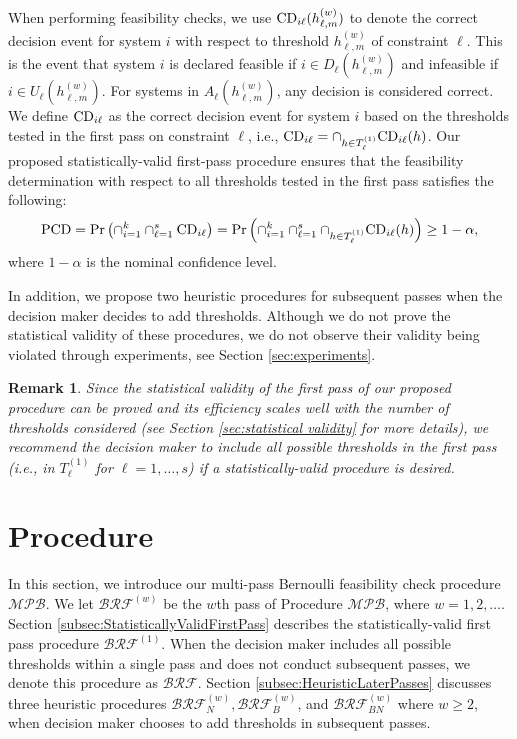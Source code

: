 \documentclass[11pt]{article}
\newtheorem{remark}{Remark}
\begin{document}
When performing feasibility checks, we use ${\rm CD}_{i\ell}(h_{\ell,m}^{(w)})$ to denote the correct decision event for system $i$ with respect to threshold $h_{\ell,m}^{(w)}$ of constraint $\ell$. This is the event that system $i$ is declared feasible if $i \in D_\ell(h_{\ell,m}^{(w)})$ and infeasible if $i \in U_\ell(h_{\ell,m}^{(w)})$. For systems in $A_\ell(h_{\ell,m}^{(w)})$, any decision is considered correct. We define ${\rm CD}_{i\ell}$ as the correct decision event for system $i$ based on the thresholds tested in the first pass on constraint $\ell$, i.e., ${\rm CD}_{i\ell}=\cap_{h\in T_\ell^{(1)} } {\rm CD}_{i\ell}(h)$. Our proposed statistically-valid first-pass procedure ensures that the feasibility determination with respect to all thresholds tested in the first pass satisfies the following:
\begin{equation*}
\label{eqn:pcd}
\displaystyle{\rm PCD}=\Pr\left(\cap_{i=1}^k \cap_{\ell=1}^s {\rm CD}_{i\ell}\right) = \Pr\left(\cap_{i=1}^k \cap_{\ell=1}^s \cap_{h\in T_\ell^{(1)} } {\rm CD}_{i\ell}(h)\right)\geq 1-\alpha,
\end{equation*}
where $1 - \alpha$ is the nominal confidence level. 

In addition, we propose two heuristic procedures for subsequent passes when the decision maker decides to add thresholds. Although we do not prove the statistical validity of these procedures, we do not observe their validity being violated through experiments, see Section \ref{sec:experiments}. 

\begin{remark}
\label{remark:berf}
    Since the statistical validity of the first pass of our proposed procedure can be proved and its efficiency scales well with the number of thresholds considered (see Section \ref{sec:statistical validity} for more details), we recommend the decision maker to include all possible thresholds in the first pass (i.e., in $T_\ell^{(1)}$ for $\ell=1,\ldots,s$) if a statistically-valid procedure is desired.
\end{remark}

\section{Procedure} 
\label{sec:procedure}

In this section, we introduce our multi-pass Bernoulli feasibility check procedure $\mathcal{MPB}$. We let
$\mathcal{BRF}^{(w)}$ be the $w$th pass of Procedure $\mathcal{MPB}$, where $w=1,2,\ldots$. Section \ref{subsec:StatisticallyValidFirstPass} describes the statistically-valid first pass procedure $\mathcal{BRF}^{(1)}$. When the decision maker includes all possible thresholds within a single pass and does not conduct subsequent passes, we denote this procedure as $\mathcal{BRF}$.
Section \ref{subsec:HeuristicLaterPasses} discusses three heuristic procedures $\mathcal{BRF}_N^{(w)},\mathcal{BRF}_B^{(w)}$, and $\mathcal{BRF}_{BN}^{(w)}$ where $w\geq 2$, when decision maker chooses to add thresholds in subsequent passes.
\end{document}
